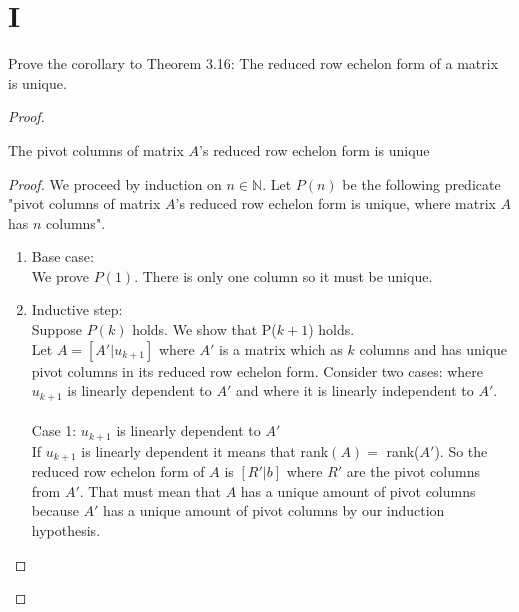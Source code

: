 \documentclass[11pt]{scrartcl}
\begin{document}
\section{I} 
Prove the corollary to Theorem 3.16: The reduced row echelon form of a matrix is unique.
\begin{proof}\\
	\begin{lemma}
		The pivot columns of matrix $A$'s reduced row echelon form is unique
		\begin{proof}
			We proceed by induction on $n \in \mathbb{N}$. Let $P(n)$ be the following predicate 
			"pivot columns of matrix $A$'s reduced row echelon form is unique, where matrix $A$ has $n$ columns".
			\begin{enumerate}[label=\alph*.]
				\item{
					Base case:\\
					We prove $P(1)$.
					There is only one column so it must be unique.
				}
				\item{
					Inductive step:\\
					Suppose $P(k)$ holds. 
					We show that P($k+1$) holds.\\
					Let $A = [A'|u_{k+1}]$ where $A'$ is a matrix which as $k$ columns and has unique pivot columns in its reduced row echelon form.
					Consider two cases: where $u_{k+1}$ is linearly dependent to $A'$ and where it is linearly independent to $A'$.\\\-\\
					Case 1: $u_{k+1}$ is linearly dependent to $A'$\\
					If $u_{k+1}$ is linearly dependent it means that rank$(A) = $ rank($A'$). So the reduced row echelon form of $A$ is 
					$[R'|b]$ where $R'$ are the pivot columns from $A'$. That must mean that $A$ has a unique amount of pivot columns because $A'$
					has a unique amount of pivot columns by our induction hypothesis.\-\\
	
}
\end{enumerate}
\end{proof}
\end{lemma}
\end{proof}
\end{document}

